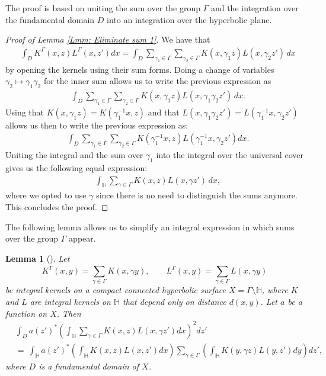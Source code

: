 \documentclass[11pt,twoside,reqno]{amsart} \usepackage{a4wide} \usepackage[T1]{fontenc} \usepackage[utf8]{inputenc} \usepackage{soul}  \usepackage{amsmath} \usepackage{amsfonts} \usepackage{amssymb} \usepackage{mathtools} \usepackage{amsthm} \usepackage{xcolor} \usepackage{graphicx} \usepackage{hyperref} \usepackage{standalone} \usepackage{esint} \usepackage{comment} \usepackage[left=2.3cm,top=3cm,right=2.3cm]{geometry} \usepackage{bm} \usepackage{svg} \usepackage{float} \numberwithin{equation}{section} \theoremstyle{plain} \newtheorem{thm}{Theorem}[section] \newtheorem{theorem}[thm]{Theorem} \newtheorem*{theorem*}{Theorem}\newtheorem{conj}[thm]{Conjecture} \newtheorem{lemma}[thm]{Lemma} \newtheorem{prop}[thm]{Proposition} \newtheorem{proposition}[thm]{Proposition} \newtheorem{cor}[thm]{Corollary} \newtheorem{question}[thm]{Question} \newtheorem{corollary}[thm]{Corollary} \newtheorem{assumption}[thm]{Assumption} \theoremstyle{definition} \newtheorem{defn}[thm]{Definition} \newtheorem{choice}[thm]{Choice} \newtheorem{definition}[thm]{Definition} \newtheorem{ex}[thm]{Example} \newtheorem{notation}[thm]{Notation} \newtheorem*{ack}{Acknowledgements} \theoremstyle{remark} \newtheorem{remark}[thm]{Remark} \newtheorem{bigremark}[thm]{Remark} \usepackage{xcolor} \newcommand{\red}[1]{ {\color{Red}#1} } \newcommand{\blue}[1]{ {\color{Blue}#1} } \author{Kai Hippi} \address{Aalto University, Espoo, Finland} \email{kai.hippi@aalto.fi}
\begin{document}
The proof is based on uniting the sum over the group $ \Gamma $ and the integration over the fundamental domain $ D $ into an integration over the hyperbolic plane.

\begin{proof}[Proof of Lemma \ref{Lmm: Eliminate sum 1}]
	We have that
	\begin{align*}
		&
		\int_{D} K^{\Gamma}( x,z ) L^{\Gamma}( x,z' ) dx = \int_{D} \sum_{\gamma_{1} \in \Gamma}^{} \sum_{\gamma_{2} \in \Gamma}^{} K( x, \gamma_{1} z ) L( x, \gamma_{2} z' ) \,dx
	\end{align*}
	by opening the kernels using their sum forms. Doing a change of variables $ \gamma_{2} \mapsto \gamma_{1} \gamma_{2} $ for the inner sum allows us to write the previous expression as
	\begin{align*}
		&
		\int_{D} \sum_{\gamma_{1} \in \Gamma}^{} \sum_{\gamma_{2} \in \Gamma}^{} K( x, \gamma_{1} z ) L( x, \gamma_{1} \gamma_{2} z' ) \, dx.
	\end{align*}
	Using that $ K( x, \gamma_{1} z ) = K( \gamma_{1}^{-1} x, z ) $ and that $ L( x, \gamma_{1} \gamma_{2} z' ) = L( \gamma_{1}^{-1} x, \gamma_{2} z' ) $ allows us then to write the previous expression as:
	\begin{align*}
		&
		\int_{D} \sum_{\gamma_{1} \in \Gamma}^{} \sum_{\gamma_{2} \in \Gamma}^{} K( \gamma_{1}^{-1} x, z ) L( \gamma_{1}^{-1} x, \gamma_{2} z' ) dx.
	\end{align*}
	Uniting the integral and the sum over $ \gamma_{1} $ into the integral over the universal cover gives us the following equal expression:
	\begin{align*}
		&
		\int_{\mathbb{H}}  \sum_{\gamma \in \Gamma}^{} K(  x, z ) L( x, \gamma z' ) \, dx,
	\end{align*}
	where we opted to use $ \gamma $ since there is no need to distinguish the sums anymore. This concludes the proof.
\end{proof}

The following lemma allows us to simplify an integral expression in which sums over the group $ \Gamma $ appear.

\begin{lemma}[]
	\label{Lmm: Eliminate sum 2}
	Let 
	$$ K^{\Gamma}( x,y ) = \sum_{\gamma \in \Gamma}^{} K( x, \gamma y ), \qquad L^{\Gamma}( x,y ) = \sum_{\gamma \in \Gamma}^{} L( x, \gamma y ) $$ 
	be integral kernels on a compact connected hyperbolic surface $ X= \Gamma \setminus \mathbb{H} $, where $ K $ and $ L $ are integral kernels on $ \mathbb{H} $ that depend only on distance $ d( x,y ) $. Let $ a $ be a function on $ X $. Then
	\begin{align*}
		&
		\int_{D}  a( z' )^{*} \left( \int_{\mathbb{H}} \sum_{\gamma \in \Gamma}^{}K( x,z ) L( x, \gamma z' ) dx \right)^{2}  dz'
		\\
		& = \
		\int_{\mathbb{H}} a( z' )^{*}  \left( \int_{\mathbb{H}} K( x,z ) L( x, z' ) dx \right) \sum_{\gamma \in \Gamma}^{}  \left( \int_{\mathbb{H}} K( y,\gamma z ) L( y, z' ) dy \right) dz',
	\end{align*}
	where $ D $ is a fundamental domain of $ X $.
\end{lemma}
\end{document}
